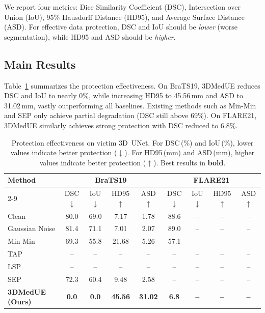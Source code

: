 \documentclass[runningheads]{llncs}
\begin{document}
We report four metrics: Dice Similarity Coefficient (DSC), Intersection over
Union (IoU), 95\% Hausdorff Distance (HD95), and Average Surface Distance
(ASD). For effective data protection, DSC and IoU should be \emph{lower}
(worse segmentation), while HD95 and ASD should be \emph{higher}.

\subsection{Main Results}\label{sec:results}

Table~\ref{tab:main} summarizes the protection effectiveness.
On BraTS19, 3DMedUE reduces DSC and IoU to nearly 0\%, while increasing
HD95 to 45.56\,mm and ASD to 31.02\,mm, vastly outperforming all baselines.
Existing methods such as Min-Min and SEP only achieve partial degradation
(DSC still above 69\%). On FLARE21, 3DMedUE similarly achieves strong
protection with DSC reduced to 6.8\%.

\begin{table}
\caption{Protection effectiveness on victim 3D~UNet. For DSC\,(\%) and
IoU\,(\%), lower values indicate better protection ($\downarrow$). For
HD95\,(mm) and ASD\,(mm), higher values indicate better protection
($\uparrow$). Best results in \textbf{bold}.}\label{tab:main}
\setlength{\tabcolsep}{3.2pt}
\footnotesize
\begin{tabular}{|l|c|c|c|c|c|c|c|c|}
\hline
\multirow{2}{*}{Method}
  & \multicolumn{4}{c|}{BraTS19}
  & \multicolumn{4}{c|}{FLARE21} \\
\cline{2-9}
  & DSC$\downarrow$ & IoU$\downarrow$ & HD95$\uparrow$ & ASD$\uparrow$
  & DSC$\downarrow$ & IoU$\downarrow$ & HD95$\uparrow$ & ASD$\uparrow$ \\
\hline
Clean
  & 80.0 & 69.0 &  7.17 &  1.78
  & 88.6 &   -- &    -- &    -- \\
Gaussian Noise
  & 81.4 & 71.1 &  7.01 &  2.07
  & 89.0 &   -- &    -- &    -- \\
Min-Min~\cite{huang2021unlearnable}
  & 69.3 & 55.8 & 21.68 &  5.26
  & 57.1 &   -- &    -- &    -- \\
TAP~\cite{fowl2021adversarial}
  &   -- &   -- &    -- &    --
  &   -- &   -- &    -- &    -- \\
LSP~\cite{yu2022availability}
  &   -- &   -- &    -- &    --
  &   -- &   -- &    -- &    -- \\
SEP~\cite{liu2023stable}
  & 72.3 & 60.4 &  9.48 &  2.58
  &   -- &   -- &    -- &    -- \\
\textbf{3DMedUE (Ours)}
  & \textbf{0.0} & \textbf{0.0} & \textbf{45.56} & \textbf{31.02}
  & \textbf{6.8} & \textbf{--} & \textbf{--} & \textbf{--} \\
\hline
\end{tabular}
\end{table}
\end{document}
